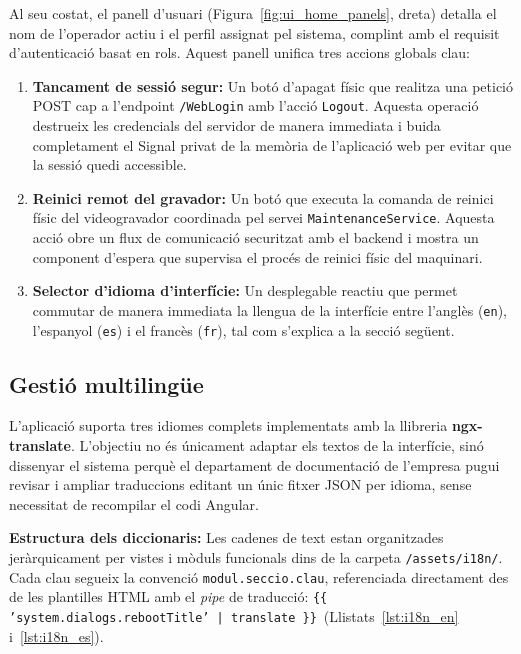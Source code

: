 Al seu costat, el panell d'usuari (Figura~\ref{fig:ui_home_panels}, dreta) detalla el nom de l'operador actiu i el perfil assignat pel sistema, complint amb el requisit d'autenticació basat en rols. Aquest panell unifica tres accions globals clau:
\begin{enumerate}
  \item \textbf{Tancament de sessió segur:} Un botó d'apagat físic que realitza una petició POST cap a l'endpoint \texttt{/WebLogin} amb l'acció \texttt{Logout}. Aquesta operació destrueix les credencials del servidor de manera immediata i buida completament el Signal privat de la memòria de l'aplicació web per evitar que la sessió quedi accessible.
  \item \textbf{Reinici remot del gravador:} Un botó que executa la comanda de reinici físic del videogravador coordinada pel servei \texttt{MaintenanceService}. Aquesta acció obre un flux de comunicació securitzat amb el backend i mostra un component d'espera que supervisa el procés de reinici físic del maquinari.
  \item \textbf{Selector d'idioma d'interfície:} Un desplegable reactiu que permet commutar de manera immediata la llengua de la interfície entre l'anglès (\texttt{en}), l'espanyol (\texttt{es}) i el francès (\texttt{fr}), tal com s'explica a la secció següent.
\end{enumerate}

\subsection{Gestió multilingüe}
L'aplicació suporta tres idiomes complets implementats amb la llibreria \textbf{ngx-translate}. L'objectiu no és únicament adaptar els textos de la interfície, sinó dissenyar el sistema perquè el departament de documentació de l'empresa pugui revisar i ampliar traduccions editant un únic fitxer JSON per idioma, sense necessitat de recompilar el codi Angular.

\textbf{Estructura dels diccionaris:} Les cadenes de text estan organitzades jeràrquicament per vistes i mòduls funcionals dins de la carpeta \texttt{/assets/i18n/}. Cada clau segueix la convenció \texttt{modul.seccio.clau}, referenciada directament des de les plantilles HTML amb el \textit{pipe} de traducció: \texttt{\{\{ 'system.dialogs.rebootTitle' | translate \}\}}~(Llistats~\ref{lst:i18n_en} i~\ref{lst:i18n_es}).

